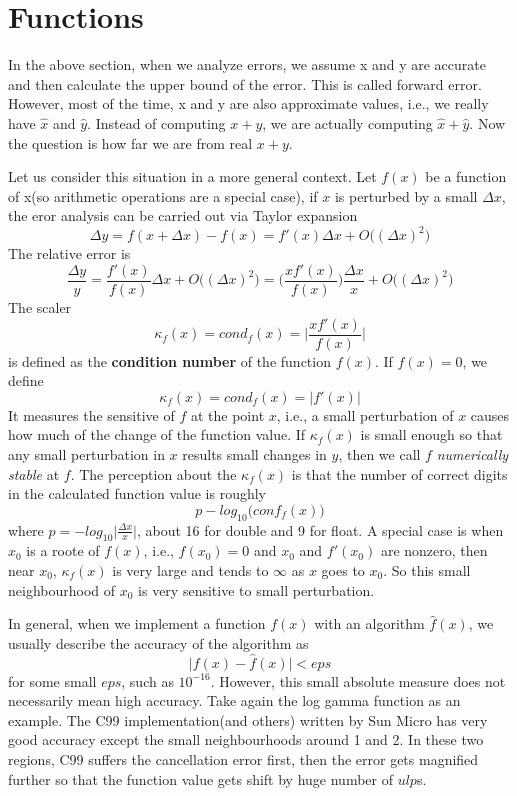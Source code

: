  
\section{Functions}
In the above section, when we analyze errors, we assume x and y are accurate and then calculate the upper bound of the error. This is called forward error. However, most of the time, x and y are also approximate values, i.e., we really have $\hat{x}$ and $\hat{y}$. Instead of computing $x + y$, we are actually computing $\hat{x} + \hat{y}$. Now the question is how far we are from real $x + y$.

Let us consider this situation in a more general context. Let $f(x)$ be a function of x(so arithmetic operations are a special case), if $x$ is perturbed by a small $\Delta x$, the eror analysis can be carried out via Taylor expansion
\[\Delta y = f(x + \Delta x) - f(x) = f'(x)\Delta x + O \Big((\Delta x)^2 \Big)\]
The relative error is
\[ \frac{\Delta y}{y} = \frac{f'(x)}{f(x)} \Delta x + O \Big((\Delta x)^2 \Big)
= \Big( \frac{xf'(x)}{f(x)} \Big) \frac{\Delta x}{x} + O \Big((\Delta x)^2 \Big)\]
The scaler 
\[ \kappa_f(x) = cond_f(x) = \Big | \frac{xf'(x)}{f(x)} \Big |\]
is defined as the \textbf{condition number} of the function $f(x)$. If $f(x) = 0$, we define 
\[ \kappa_f(x) = cond_f(x) = | f'(x) |\]
It measures the sensitive of $f$ at the point $x$, i.e., a small perturbation of $x$ causes how much of the change of the function value. If $\kappa_f(x)$ is small enough so that any small perturbation in $x$ results small changes in $y$, then we call $f$ \textit{ numerically stable} at $f$. The perception about the $\kappa_f(x)$ is that the number of correct digits in the calculated function value is roughly 
\[p - log_{10}\Big(conf_f(x)\Big)\] 
where $p = -log_{10}\Big | \frac{\Delta x}{x} \Big |$, about 16 for double and 9 for float. A special case is when $x_0$ is a roote of $f(x)$, i.e., $f(x_0) = 0$ and $x_0$ and $f'(x_0)$ are nonzero, then near $x_0$, $\kappa_f(x)$ is very large and tends to $\infty$ as $x$ goes to $x_0$. So this small neighbourhood of $x_0$ is very sensitive to small perturbation. 

In general, when we implement a function $f(x)$ with an algorithm $\hat{f}(x)$, we usually describe the accuracy of the algorithm as 
\[\big|f(x) - \hat{f}(x)\big| < eps\] 
for some small $eps$, such as $10^{-16}$. However, this small absolute measure does not necessarily mean high accuracy. Take again the log gamma function as an example. The C99 implementation(and others) written by Sun Micro has very good accuracy except the small neighbourhoods around 1 and 2. In these two regions, C99 suffers the cancellation error first, then the error gets magnified further so that the function value gets shift by huge number of $ulp$s.

